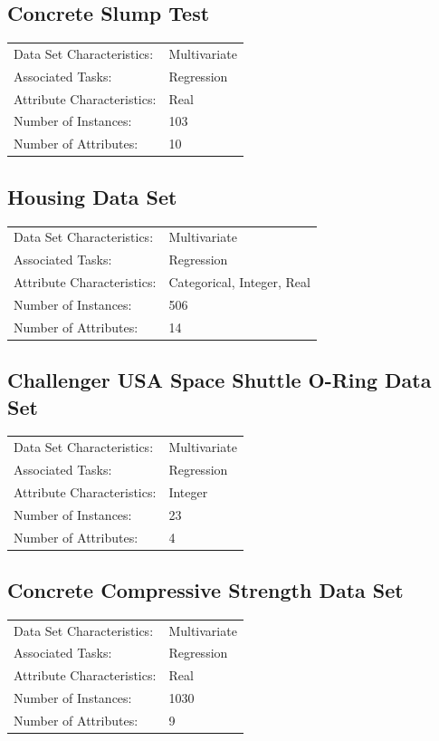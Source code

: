 \documentclass[11pt, a4paper]{report}
\begin{document}
\subsection{Concrete Slump Test}
\begin{tabular}{l l}
	Data Set Characteristics:  & Multivariate \\
	Associated Tasks: & Regression  \\
	Attribute Characteristics: & Real \\
	Number of Instances: & 103 \\
	Number of Attributes: & 10 \\
\end{tabular}

\subsection{Housing Data Set}
\begin{tabular}{l l}
	Data Set Characteristics:  & Multivariate \\
	Associated Tasks: & Regression  \\
	Attribute Characteristics: & Categorical, Integer, Real \\
	Number of Instances: & 506 \\
	Number of Attributes: & 14 \\
\end{tabular}

\subsection{Challenger USA Space Shuttle O-Ring Data Set }
\begin{tabular}{l l}
	Data Set Characteristics:  & Multivariate \\
	Associated Tasks: & Regression  \\
	Attribute Characteristics: & Integer \\
	Number of Instances: & 23 \\
	Number of Attributes: & 4 \\
\end{tabular}

\subsection{Concrete Compressive Strength Data Set}
\begin{tabular}{l l}
	Data Set Characteristics:  & Multivariate \\
	Associated Tasks: & Regression  \\
	Attribute Characteristics: & Real \\
	Number of Instances: & 1030 \\
	Number of Attributes: & 9 \\
\end{tabular}
\end{document}
